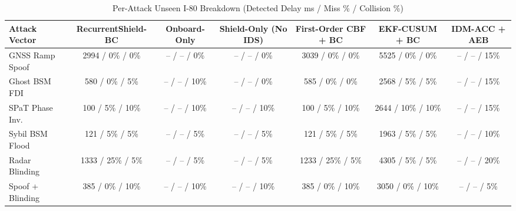 \begin{table}[t]
\centering
\caption{Per-Attack Unseen I-80 Breakdown (Detected Delay ms / Miss \% / Collision \%)}
\label{tab:per_attack_i80}
\scriptsize
\setlength{\tabcolsep}{2.4pt}
\begin{tabular}{lcccccc}
\toprule
Attack Vector & RecurrentShield-BC & Onboard-Only & Shield-Only (No IDS) & First-Order CBF + BC & EKF-CUSUM + BC & IDM-ACC + AEB \\
\midrule
GNSS Ramp Spoof & 2994 / 0\% / 0\% & -- / -- / 0\% & -- / -- / 0\% & 3039 / 0\% / 0\% & 5525 / 0\% / 0\% & -- / -- / 15\% \\
Ghost BSM FDI & 580 / 0\% / 5\% & -- / -- / 10\% & -- / -- / 0\% & 585 / 0\% / 0\% & 2568 / 5\% / 5\% & -- / -- / 15\% \\
SPaT Phase Inv. & 100 / 5\% / 10\% & -- / -- / 10\% & -- / -- / 10\% & 100 / 5\% / 10\% & 2644 / 10\% / 10\% & -- / -- / 15\% \\
Sybil BSM Flood & 121 / 5\% / 5\% & -- / -- / 5\% & -- / -- / 5\% & 121 / 5\% / 5\% & 1963 / 5\% / 5\% & -- / -- / 10\% \\
Radar Blinding & 1333 / 25\% / 5\% & -- / -- / 5\% & -- / -- / 5\% & 1233 / 25\% / 5\% & 4305 / 5\% / 5\% & -- / -- / 20\% \\
Spoof + Blinding & 385 / 0\% / 10\% & -- / -- / 10\% & -- / -- / 10\% & 385 / 0\% / 10\% & 3050 / 0\% / 10\% & -- / -- / 5\% \\
\bottomrule
\end{tabular}
\end{table}